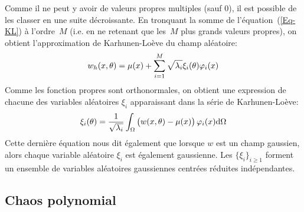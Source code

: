 \medskip
Comme il ne peut y avoir de valeurs propres multiples (sauf 0), il est possible de les classer en une suite décroissante. En tronquant la somme de l'équation~(\ref{Eq-KL}) à l'ordre~$M$ (i.e. en ne retenant que les~$M$ plus grands valeurs propres), on obtient l'approximation de Karhunen-Loève du champ aléatoire:
\begin{equation}\label{Eq-KL}
w_h(x,\theta) = \mu(x) + \displaystyle\sum_{i=1}^M \sqrt{\lambda_i}\xi_i(\theta)\varphi_i(x)
\end{equation}
\medskipvm
Comme les fonction propres sont orthonormales, on obtient une expression de chacune des variables aléatoires $\xi_i$ apparaissant dans la série de Karhunen-Loève:
\begin{equation}
\xi_i(\theta)=\dfrac1{\sqrt{\lambda_i}}\displaystyle\int_\Omega \begin{pmatrix}w(x,\theta)-\mu(x)\end{pmatrix}\varphi_i(x)\text{d}\Omega
\end{equation}
Cette dernière équation nous dit également que lorsque $w$ est un champ gaussien, alors chaque variable aléatoire $\xi_i$ est également gaussienne.
Les $\{\xi_i\}_{i\ge1}$ forment un ensemble de variables aléatoires gaussiennes centrées réduites indépendantes.


\medskip
\subsection{Chaos polynomial}

